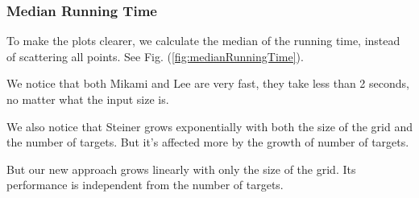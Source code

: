 \subsubsection{Median Running Time}
To make the plots clearer, we calculate the median of the running time, instead of scattering all points. See Fig. (\ref{fig:medianRunningTime}).

We notice that both Mikami and Lee are very fast, they take less than 2 seconds, no matter what the input size is.

We also notice that Steiner grows exponentially with both the size of the grid and the number of targets. But it's affected more by the growth of number of targets.

But our new approach grows linearly with only the size of the grid. Its performance is independent from the number of targets.

